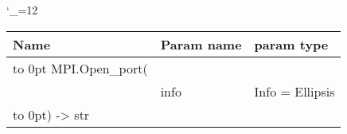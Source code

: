 \begingroup \catcode`\_=12 \tt
\begin{tabular}{lll}
\toprule
\textrm{Name}&\textrm{Param name}&\textrm{param type}\\
\midrule
\hbox to 0pt {MPI.Open_port(\hss}\\
& info & Info = Ellipsis\\
\hbox to 0pt{) -> str\hss}\\
\bottomrule
\end{tabular}
\endgroup
